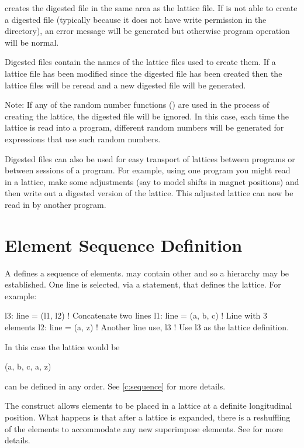 \bmad creates the digested file in the same area as the lattice file.  If \bmad is not able to
create a digested file (typically because it does not have write permission in the directory), an
error message will be generated but otherwise program operation will be normal.

Digested files contain the names of the lattice files used to create them. If a lattice file has
been modified since the digested file has been created then the lattice files will be reread and a
new digested file will be generated.

Note: If any of the random number functions () are used in the process of creating
the lattice, the digested file will be ignored. In this case, each time the lattice is read into a
program, different random numbers will be generated for expressions that use such random numbers.

Digested files can also be used for easy transport of lattices between programs or between sessions
of a program. For example, using one program you might read in a lattice, make some adjustments (say
to model shifts in magnet positions) and then write out a digested version of the lattice. This
adjusted lattice can now be read in by another program.

\section{Element Sequence Definition}

A  defines a sequence of elements.  may contain other  and so a
hierarchy may be established. One line is selected, via a  statement, that defines the
lattice. For example:
\begin{example}
  l3: line = (l1, l2)   ! Concatenate two lines
  l1: line = (a, b, c)  ! Line with 3 elements
  l2: line = (a, z)     ! Another line 
  use, l3               ! Use l3 as the lattice definition.
\end{example}
In this case the lattice would be
\begin{example}
  (a, b, c, a, z)
\end{example}
 can be defined in any order. See \cref{c:sequence} for more
details.

The  construct allows elements to be placed in a lattice at a definite longitudinal
position. What happens is that after a lattice is expanded, there is a reshuffling of the elements
to accommodate any new superimpose elements. See  for more details.

